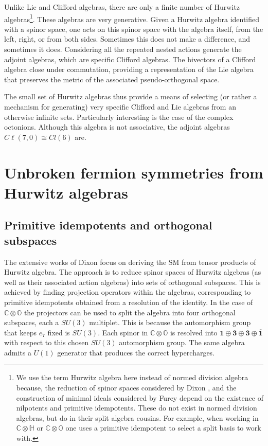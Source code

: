 \documentclass[a4paper]{jpconf}
\begin{document}
Unlike Lie and Clifford algebras, there are only a finite number of Hurwitz algebras\footnote{We use the term Hurwitz algebra here instead of normed division algebra because, the reduction of spinor spaces considered by Dixon \cite{dixon2013division}, and the construction of minimal ideals considered by Furey \cite{furey2016standard} depend on the existence of nilpotents and primitive idempotents. These do not exist in normed division algebras, but do in their split algebra cousins. For example, when working in $\mathbb{C}\otimes\mathbb{H}$ or $\mathbb{C}\otimes\mathbb{O}$ one uses a primitive idempotent to select a split basis to work with.}. These algebras are very generative. Given a Hurwitz algebra identified with a spinor space, one acts on this spinor space with the algebra itself, from the left, right, or from both sides. Sometimes this does not make a difference, and sometimes it does. Considering all the repeated nested actions generate the adjoint algebras, which are specific Clifford algebras. The bivectors of a Clifford algebra close under commutation, providing a representation of the Lie algebra that preserves the metric of the associated pseudo-orthogonal space.

The small set of Hurwitz algebras thus provide a means of selecting (or rather a mechanism for generating) very specific Clifford and Lie algebras from an otherwise infinite sets. Particularly interesting is the case of the complex octonions. Although this algebra is not associative, the adjoint algebras $C\ell(7,0)\cong Cl(6)$ are. 
\section{Unbroken fermion symmetries from Hurwitz algebras}

\subsection{Primitive idempotents and orthogonal subspaces}

The extensive works of Dixon \cite{dixon2013division,dixon1990derivation,dixon2010division} focus on deriving the SM from tensor products of Hurwitz algebra. The approach is to reduce spinor spaces of Hurwitz algebras (as well as their associated action algebras) into sets of orthogonal subspaces. This is achieved by finding projection operators within the algebras, corresponding to primitive idempotents obtained from a resolution of the identity. In the case of $\mathbb{C}\otimes\mathbb{O}$ the projectors can be used to split the algebra into four orthogonal subspaces, each a $SU(3)$ multiplet. This is because the automorphism group that keeps $e_7$ fixed is $SU(3)$. Each spinor in $\mathbb{C}\otimes\mathbb{O}$ is resolved into $\mathbf{1}\oplus\mathbf{3}\oplus\mathbf{\overline{3}}\oplus\mathbf{\overline{1}}$ with respect to this chosen $SU(3)$ automorphism group\cite{dixon2013division}. The same algebra admits a $U(1)$ generator that produces the correct hypercharges. 
\end{document}
